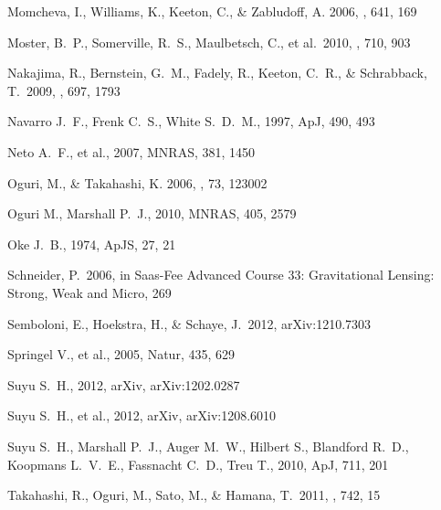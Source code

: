 \begin{thebibliography}{99}
{Momcheva}, I., {Williams}, K., {Keeton}, C., \& {Zabludoff}, A. 2006, \apj,
  641, 169


 Moster, B.~P., 
Somerville, R.~S., Maulbetsch, C., et al.\ 2010, \apj, 710, 903 


 Nakajima, R., 
Bernstein, G.~M., Fadely, R., Keeton, C.~R., 
\& Schrabback, T.\ 2009, \apj, 697, 1793 

 Navarro J.~F., Frenk C.~S., White S.~D.~M., 1997, ApJ, 490, 493 


Neto A.~F., et al., 2007, MNRAS, 381, 1450 


{Oguri}, M., \& {Takahashi}, K. 2006, \prd, 73, 123002

 Oguri M., Marshall P.~J., 2010, MNRAS, 405, 2579 


 Oke 
J.~B., 1974, ApJS, 27, 21 

 Schneider, P.\ 2006, 
in Saas-Fee Advanced Course 33: Gravitational Lensing: Strong, Weak and Micro, 
269 

 Semboloni, E., 
Hoekstra, H., \& Schaye, J.\ 2012, arXiv:1210.7303 


 Springel V., et al., 2005, Natur, 435, 629 


 Suyu 
S.~H., 2012, arXiv, arXiv:1202.0287 


Suyu S.~H., et al., 2012, arXiv, arXiv:1208.6010 


Suyu S.~H., Marshall P.~J., Auger M.~W., Hilbert S., Blandford R.~D., 
Koopmans L.~V.~E., Fassnacht C.~D., Treu T., 2010, ApJ, 711, 201 

 Takahashi, R., Oguri, 
M., Sato, M., \& Hamana, T.\ 2011, \apj, 742, 15 



\end{thebibliography}
